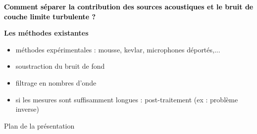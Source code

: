 \documentclass[10pt,xcolor=x11names,compress, show notes]{beamer}%
\begin{document}
\begin{frame}[t]{\insertsectionhead}
	\begin{center}
		\textcolor{black}{\bfseries \centering  Comment séparer la contribution des sources acoustiques et le bruit de couche limite turbulente ?}
	\end{center}
	\vfill

{ \bfseries Les méthodes existantes }
	\begin{itemize}
        		\item méthodes expérimentales : mousse, kevlar, microphones déportés,...
        		\item soustraction du bruit de fond
        		\item filtrage en nombres d'onde
        		\item si les mesures sont suffisamment longues : post-traitement (ex : problème inverse)
	\end{itemize}

	\vfill
{}
\end{frame}

\begin{frame}{Plan de la présentation}
	\tableofcontents[]
\end{frame}
\end{document}
